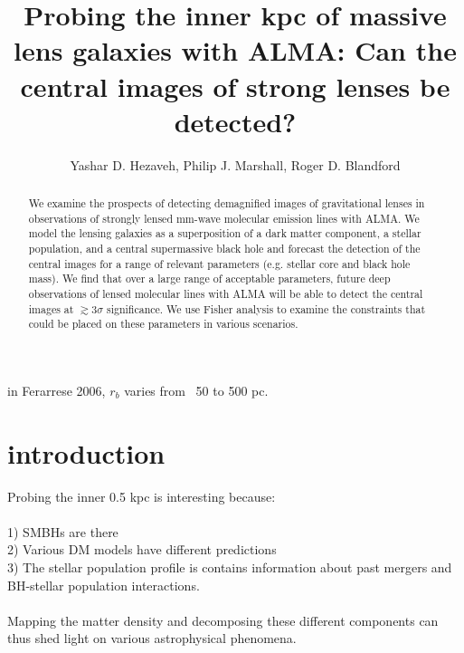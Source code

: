 \documentclass[chicago]{emulateapj}
\begin{document}
\title{Probing the inner kpc of massive lens galaxies with ALMA: Can the central images of strong lenses be detected?}
\author{Yashar D. Hezaveh, Philip J. Marshall, Roger D. Blandford}  

\begin{abstract}  
\noindent
We examine the prospects of detecting demagnified images of gravitational lenses in observations of strongly lensed mm-wave molecular emission lines with ALMA. We model the lensing galaxies as a superposition of a dark matter component, a stellar population, and a central supermassive black hole and forecast the detection of the central images for a range of relevant parameters (e.g. stellar core and black hole mass).
We find that over a large range of acceptable parameters, future deep observations of lensed molecular lines with ALMA will be able to detect the central images at $\gtrsim 3\sigma$ significance. We use Fisher analysis to examine the  constraints that could be placed on these parameters in various scenarios. 

\end{abstract}

in Ferarrese 2006, $r_b$ varies from ~50 to 500 pc. 





\section{introduction}
\begin{framed}
Probing the inner 0.5 kpc is interesting because: \\ \\1) SMBHs are there \\2) Various DM models have different predictions \\3) The stellar population profile is contains information about past mergers and BH-stellar population interactions. 
\\
\\
Mapping the matter density and decomposing these different components can thus shed light on various astrophysical phenomena.
\end{framed}
\end{document}
